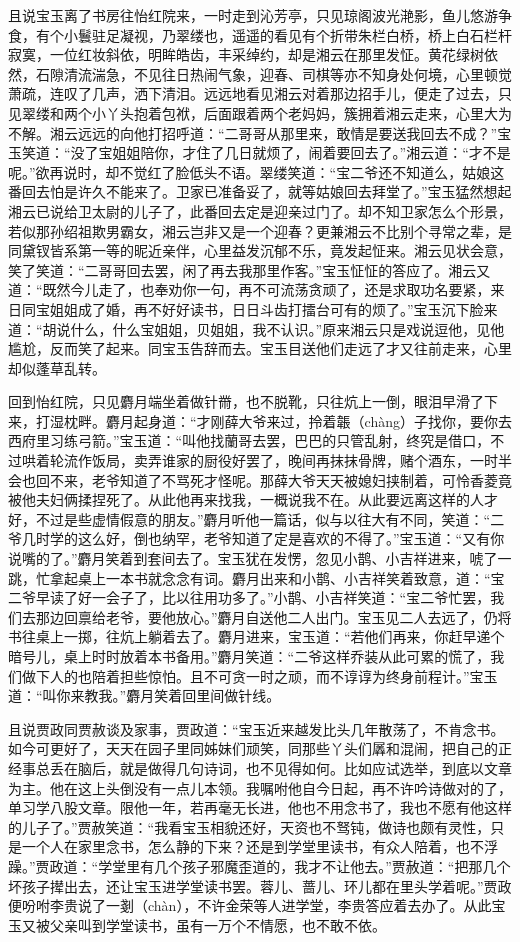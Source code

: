 \documentclass[12pt,oneside]{book}
\begin{document}
且说宝玉离了书房往怡红院来，一时走到沁芳亭，只见琼阁波光滟影，鱼儿悠游争食，有个小鬟驻足凝视，乃翠缕也，遥遥的看见有个折带朱栏白桥，桥上白石栏杆寂寞，一位红妆斜依，明眸皓齿，丰采绰约，却是湘云在那里发怔。黄花绿树依然，石隙清流湍急，不见往日热闹气象，迎春、司棋等亦不知身处何境，心里顿觉萧疏，连叹了几声，洒下清泪。远远地看见湘云对着那边招手儿，便走了过去，只见翠缕和两个小丫头抱着包袱，后面跟着两个老妈妈，簇拥着湘云走来，心里大为不解。湘云远远的向他打招呼道：“二哥哥从那里来，敢情是要送我回去不成？”宝玉笑道：“没了宝姐姐陪你，才住了几日就烦了，闹着要回去了。”湘云道：“才不是呢。”欲再说时，却不觉红了脸低头不语。翠缕笑道：“宝二爷还不知道么，姑娘这番回去怕是许久不能来了。卫家已准备妥了，就等姑娘回去拜堂了。”宝玉猛然想起湘云已说给卫太尉的儿子了，此番回去定是迎亲过门了。却不知卫家怎么个形景，若似那孙绍祖欺男霸女，湘云岂非又是一个迎春？更兼湘云不比别个寻常之辈，是同黛钗皆系第一等的昵近亲伴，心里益发沉郁不乐，竟发起怔来。湘云见状会意，笑了笑道：“二哥哥回去罢，闲了再去我那里作客。”宝玉怔怔的答应了。湘云又道：“既然今儿走了，也奉劝你一句，再不可流荡贪顽了，还是求取功名要紧，来日同宝姐姐成了婚，再不好好读书，日日斗齿打擂台可有的烦了。”宝玉沉下脸来道：“胡说什么，什么宝姐姐，贝姐姐，我不认识。”原来湘云只是戏说逗他，见他尴尬，反而笑了起来。同宝玉告辞而去。宝玉目送他们走远了才又往前走来，心里却似蓬草乱转。

回到怡红院，只见麝月端坐着做针黹，也不脱靴，只往炕上一倒，眼泪早滑了下来，打湿枕畔。麝月起身道：“才刚薛大爷来过，拎着韔（chàng）子找你，要你去西府里习练弓箭。”宝玉道：“叫他找蘭哥去罢，巴巴的只管乱射，终究是借口，不过哄着轮流作饭局，卖弄谁家的厨役好罢了，晚间再抹抹骨牌，赌个酒东，一时半会也回不来，老爷知道了不骂死才怪呢。那薛大爷天天被媳妇挟制着，可怜香菱竟被他夫妇俩揉捏死了。从此他再来找我，一概说我不在。从此要远离这样的人才好，不过是些虚情假意的朋友。”麝月听他一篇话，似与以往大有不同，笑道：“二爷几时学的这么好，倒也纳罕，老爷知道了定是喜欢的不得了。”宝玉道：“又有你说嘴的了。”麝月笑着到套间去了。宝玉犹在发愣，忽见小鹊、小吉祥进来，唬了一跳，忙拿起桌上一本书就念念有词。麝月出来和小鹊、小吉祥笑着致意，道：“宝二爷早读了好一会子了，比以往用功多了。”小鹊、小吉祥笑道：“宝二爷忙罢，我们去那边回禀给老爷，要他放心。”麝月自送他二人出门。宝玉见二人去远了，仍将书往桌上一掷，往炕上躺着去了。麝月进来，宝玉道：“若他们再来，你赶早递个暗号儿，桌上时时放着本书备用。”麝月笑道：“二爷这样乔装从此可累的慌了，我们做下人的也陪着担些惊怕。且不可贪一时之顽，而不谆谆为终身前程计。”宝玉道：“叫你来教我。”麝月笑着回里间做针线。

且说贾政同贾赦谈及家事，贾政道：“宝玉近来越发比头几年散荡了，不肯念书。如今可更好了，天天在园子里同姊妹们顽笑，同那些丫头们羼和混闹，把自己的正经事总丢在脑后，就是做得几句诗词，也不见得如何。比如应试选举，到底以文章为主。他在这上头倒没有一点儿本领。我嘱咐他自今日起，再不许吟诗做对的了，单习学八股文章。限他一年，若再毫无长进，他也不用念书了，我也不愿有他这样的儿子了。”贾赦笑道：“我看宝玉相貌还好，天资也不驽钝，做诗也颇有灵性，只是一个人在家里念书，怎么静的下来？还是到学堂里读书，有众人陪着，也不浮躁。”贾政道：“学堂里有几个孩子邪魔歪道的，我才不让他去。”贾赦道：“把那几个坏孩子撵出去，还让宝玉进学堂读书罢。蓉儿、蔷儿、环儿都在里头学着呢。”贾政便吩咐李贵说了一剗（chàn），不许金荣等人进学堂，李贵答应着去办了。从此宝玉又被父亲叫到学堂读书，虽有一万个不情愿，也不敢不依。
\end{document}

